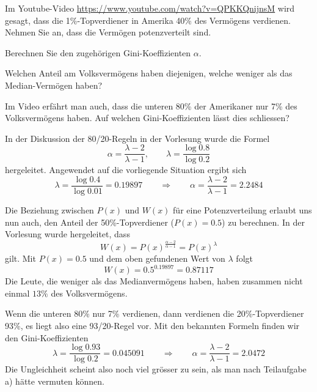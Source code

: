 Im Youtube-Video \url{https://www.youtube.com/watch?v=QPKKQnijnsM} wird
gesagt, dass die 1\%-Topverdiener in Amerika 40\% des Vermögens
verdienen. Nehmen Sie an, dass die Vermögen potenzverteilt sind.
\begin{teilaufgaben}
\item
Berechnen Sie den zugehörigen Gini-Koeffizienten $\alpha$.
\item
Welchen Anteil am Volksvermögens haben diejenigen, welche
weniger als das Median-Vermögen haben?
\item
Im Video erfährt man auch, dass die unteren 80\% der Amerikaner nur
7\% des Volksvermögens haben. 
Auf welchen Gini-Koeffizienten lässt dies schliessen?
\end{teilaufgaben}

\begin{loesung}
\begin{teilaufgaben}
\item
In der Diskussion der 80/20-Regeln in der Vorlesung wurde die Formel
\[
\alpha=\frac{\lambda-2}{\lambda-1},\qquad \lambda=\frac{\log 0.8}{\log 0.2}
\]
hergeleitet. Angewendet auf die vorliegende Situation ergibt sich
\[
\lambda=\frac{\log 0.4}{\log 0.01}=0.19897
\qquad
\Rightarrow
\qquad
\alpha=\frac{\lambda - 2}{\lambda - 1}=2.2484
\]
\item
Die Beziehung zwischen $P(x)$ und $W(x)$ für eine Potenzverteilung erlaubt
uns nun auch, den Anteil der 50\%-Topverdiener ($P(x)=0.5$) zu berechnen.
In der Vorlesung wurde hergeleitet, dass 
\[
W(x)=P(x)^\frac{\alpha - 2}{\alpha - 1}=P(x)^\lambda
\]
gilt. Mit $P(x)=0.5$ und dem oben gefundenen Wert von $\lambda$
folgt
\[
W(x)=0.5^{0.19897}=0.87117
\]
Die Leute, die weniger als das Medianvermögens haben, haben zusammen
nicht einmal $13\%$ des Volksvermögens.
\item
Wenn die unteren 80\% nur 7\% verdienen, dann verdienen die 20\%-Topverdiener
93\%, es liegt also eine 93/20-Regel vor. Mit den bekannten Formeln finden
wir den Gini-Koeffizienten
\[
\lambda=\frac{\log 0.93}{\log 0.2}=0.045091
\qquad\Rightarrow\qquad
\alpha=\frac{\lambda - 2}{\lambda - 1}=2.0472
\]
Die Ungleichheit scheint also noch viel grösser zu sein, als
man nach Teilaufgabe a) hätte vermuten können.
\qedhere
\end{teilaufgaben}
\end{loesung}


